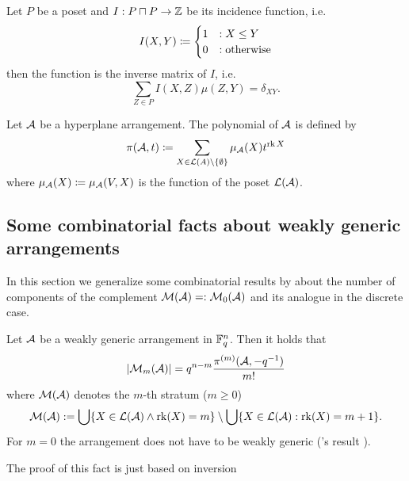 \begin{definition}
    Let $P$ be a poset and $I:P\setprod P\to \ints$ be its incidence function, i.e.
    $$
    I(X,Y)\mathrel{\mathrel{\mathop:}\mkern-1.2mu=}
    \begin{cases}
        1 &: X\leq Y\\
        0 &:\textrm{otherwise}
    \end{cases}
    $$
    then the  function is the inverse matrix of $I$, i.e.
    $$
    \sum_{Z\in P}{I(X,Z)\mu(Z,Y)}=\delta_{XY}.
    $$
\end{definition}

\begin{definition}
    Let $\mathcal{A}$ be a hyperplane arrangement. The  polynomial of $\mathcal{A}$ is defined by
    $$
    \pi(\cA,t)\defeq\sum_{X\in\cL(A)\setminus\set{\emptyset}}{\mu_{\cA}(X)t^{\rk X}}
    $$
    where $\mu_{\mathcal{A}}(X)\mathrel{\mathrel{\mathop:}\mkern-1.2mu=}\mu_{\mathcal{A}}(V,X)$ is the  function of the poset $\mathcal{L}(\mathcal{A})$.
\end{definition}


\subsection{Some combinatorial facts about weakly generic arrangements}

In this section we generalize some combinatorial results by  about the number of components of the complement $\mathcal{M}(\mathcal{A})=:\mathcal{M}_0(\mathcal{A})$ and its analogue in the discrete case.

\begin{lemma}
    Let $\mathcal{A}$ be a weakly generic arrangement in $\mathbb{F}_{q}^n$. Then it holds that
    $$
        \left|\mathcal{M}_m(\mathcal{A})\right|= q^{n-m}\frac{\pi^{(m)}(\mathcal{A},-q^{-1})}{m!}
    $$
    where $\mathcal{M}(\mathcal{A})$ denotes the $m$-th stratum ($m\geq 0$)
    $$        \mathcal{M}(\mathcal{A}):=\bigcup\{X\in\mathcal{L}(\mathcal{A})\wedge \mathop\mathrm{rk}(X)=m\}\setminus\bigcup\{X\in\mathcal{L}(\mathcal{A}):\mathop\mathrm{rk}(X)=m+1\}\text{.}
    $$
    For $m=0$ the arrangement does not have to be weakly generic ('s result \cite{zas}).
\end{lemma}

The proof of this fact is just based on  inversion


